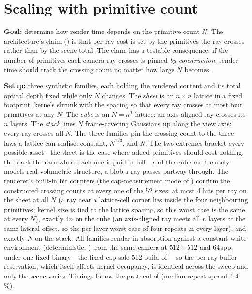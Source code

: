 \section{Scaling with primitive count}
\label{sec:results-scaling}

\textbf{Goal:} determine how render time depends on the primitive count $N$. The
architecture's claim () is that per-ray cost is set by the
primitives the ray crosses rather than by the scene total. The claim has a testable
consequence: if the number of primitives each camera ray crosses is pinned \emph{by
construction}, render time should track the crossing count no matter how large $N$
becomes.

\textbf{Setup:} three synthetic families, each holding the rendered content and its total
optical depth fixed while only $N$ changes. The \emph{sheet} is an $n\times n$ lattice in
a fixed footprint, kernels shrunk with the spacing so that every ray crosses at most four primitives at any $N$. The \emph{cube} is an $N{=}n^3$ lattice: an axis-aligned ray crosses its $n$ layers. The \emph{stack} lines $N$ frame-covering
Gaussians up along the view axis: every ray crosses all $N$. The three families pin the
crossing count to the three laws a lattice can realise: constant, $N^{1/3}$, and $N$. The two extremes bracket every possible asset---the sheet is the case where
added primitives should cost nothing, the stack the case where each one is paid in
full---and the cube most closely models real volumetric structure, a blob a ray passes
partway through. The renderer's built-in hit counters (the cap-measurement mode of )
confirm the constructed crossing counts at every one of the \num{52} sizes: at most
\num{4} hits per ray on the sheet at all $N$ (a ray near a lattice-cell corner lies inside the four neighbouring primitives; kernel
size is tied to the lattice spacing, so this worst case is the same at every $N$), exactly $4n$ on the cube (an axis-aligned ray meets all $n$ layers at the same lateral
offset, so the per-layer worst case of four repeats in every layer), and exactly $N$ on the
stack. All families render in absorption against a constant white environment
(deterministic, ) from the same camera at $512\times512$ and
\num{64}\,spp, under one fixed binary---the fixed-cap safe-\num{512} build of
---so the per-ray buffer reservation, which itself affects
kernel occupancy, is identical across the sweep and only the scene varies. Timings
follow the protocol of  (median repeat spread \num{1.4}\,\%).

